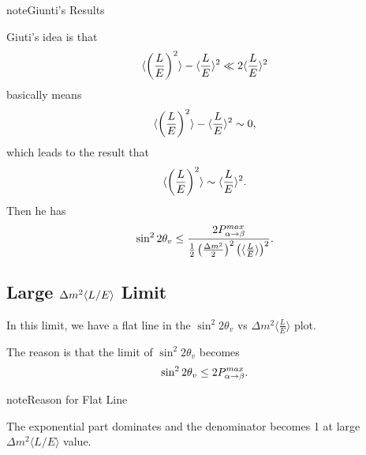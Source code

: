 \documentclass[letterpaper,12pt,english]{sphinxmanual}
\begin{document}
\begin{notice}{note}{Giunti's Results}

Giuti's idea is that
\begin{gather}
\begin{split}\langle \left(\frac{L}{E} \right)^2 \rangle - \langle \frac{L}{E}\rangle^2 \ll 2\langle \frac{L}{E}\rangle^2\end{split}\notag
\end{gather}
basically means
\begin{gather}
\begin{split}\langle \left(\frac{L}{E} \right)^2 \rangle - \langle \frac{L}{E}\rangle^2 \sim 0,\end{split}\notag
\end{gather}
which leads to the result that
\begin{gather}
\begin{split}\langle \left(\frac{L}{E} \right)^2 \rangle \sim \langle \frac{L}{E}\rangle^2.\end{split}\notag
\end{gather}
Then he has
\begin{gather}
\begin{split}\sin^2 2\theta_v \leq \frac{2 P_{\alpha\to\beta}^{max} }{ \frac{1}{2} \left( \frac{\Delta m^2}{2} \right)^2  \left(\langle\frac{L}{E} \rangle\right)^2 }.\end{split}\notag
\end{gather}\end{notice}


\subsection{Large \protect\(\Delta m^2 \langle L/E \rangle\protect\) Limit}
\label{experiments:large-limit}
In this limit, we have a flat line in the \(\sin^2 2\theta_v\) vs \(\Delta m^2 \langle\frac{L}{E}\rangle\) plot.

The reason is that the limit of \(\sin^2 2\theta_v\) becomes
\begin{gather}
\begin{split}\sin^2 2\theta_v \leq 2  P_{\alpha\to\beta}^{max}.\end{split}\notag
\end{gather}
\begin{notice}{note}{Reason for Flat Line}

The exponential part dominates and the denominator becomes 1 at large \(\Delta m^2 \langle L/E \rangle\) value.
\end{notice}
\end{document}
